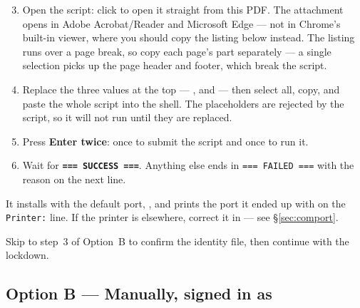 \documentclass[a4paper,10pt]{article}
\begin{document}

\begin{enumerate}\setcounter{enumi}{2}
  \item Open the script: click 
        to open it straight from this PDF.
        The attachment opens in Adobe Acrobat/Reader and Microsoft Edge ---
        not in Chrome's built-in viewer, where you should copy the listing
        below instead. The listing runs over a page break, so copy each
        page's part separately --- a single selection picks up the page
        header and footer, which break the script.

  \item Replace the three values at the top --- ,
         and  --- then select all,
        copy, and paste the whole script into the shell. The placeholders
        are rejected by the script, so it will not run until they are
        replaced.

  \item Press \textbf{Enter twice}: once to submit the script and once to
        run it.

  \item Wait for \textbf{\texttt{=== SUCCESS ===}}. Anything else ends in
        \texttt{=== FAILED ===} with the reason on the next line.
\end{enumerate}



\begin{wkinfo}
It installs with the default port, , and prints the port it
ended up with on the \texttt{Printer:} line. If the printer is elsewhere,
correct it in  --- see \S\ref{sec:comport}.
\end{wkinfo}

Skip to step~3 of Option~B to confirm the identity file, then continue with
the lockdown.

\subsection{Option B --- Manually, signed in as }
\end{document}
